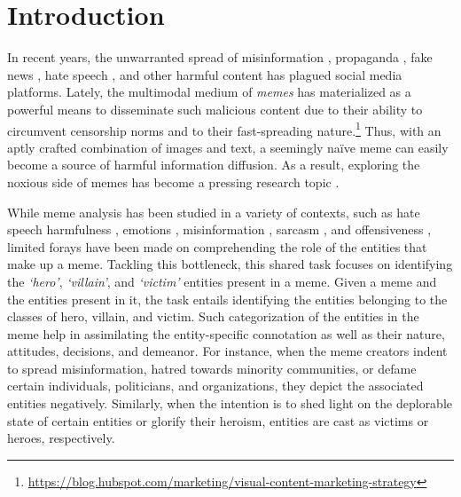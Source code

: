 \documentclass[11pt]{article}
\begin{document}
\section{Introduction}

In recent years, the unwarranted spread of misinformation \cite{wu2019misinformation}, propaganda \cite{da-san-martino-etal-2020-semeval}, fake news \cite{ALDWAIRI2018215}, hate speech \cite{MacAvaney2019Hate}, and other harmful content has plagued social media platforms. Lately, the multimodal medium of \textit{memes} has materialized as a powerful means to disseminate such malicious content due to their ability to circumvent censorship norms \cite{mina2014batman} and to their fast-spreading nature.\footnote{\url{https://blog.hubspot.com/marketing/visual-content-marketing-strategy}} Thus, with an aptly crafted combination of images and text, a seemingly na\"{i}ve meme can easily become a source of harmful information diffusion. As a result, exploring the noxious side of memes has become a pressing research topic \cite{sharma-etal-2020-semeval,pramanick-etal-2021-detecting}.

While meme analysis has been studied in a variety of contexts, such as hate speech \cite{zhou2021multimodal,kiela2020hateful} harmfulness \cite{pramanick-etal-2021-detecting,pramanick-etal-2021-momenta-multimodal}, emotions \cite{sharma-etal-2020-semeval}, misinformation \cite{zidani2021memes}, sarcasm \cite{kumar2019sarc}, and offensiveness \cite{suryawanshi-etal-2020-multimodal}, limited forays have been made on comprehending the role of the entities that make up a meme. Tackling this bottleneck, this shared task focuses on identifying the \textit{`hero'}, \textit{`villain'}, and \textit{`victim'} entities present in a meme. Given a meme and the entities present in it, the task entails identifying the entities belonging to the classes of hero, villain, and victim. Such categorization of the entities in the meme help in assimilating the entity-specific connotation as well as their nature, attitudes, decisions, and demeanor. For instance, when the meme creators indent to spread misinformation, hatred towards minority communities, or defame certain individuals, politicians, and organizations, they depict the associated entities negatively. Similarly, when the intention is to shed light on the deplorable state of certain entities or glorify their heroism, entities are cast as victims or heroes, respectively. 
\end{document}
